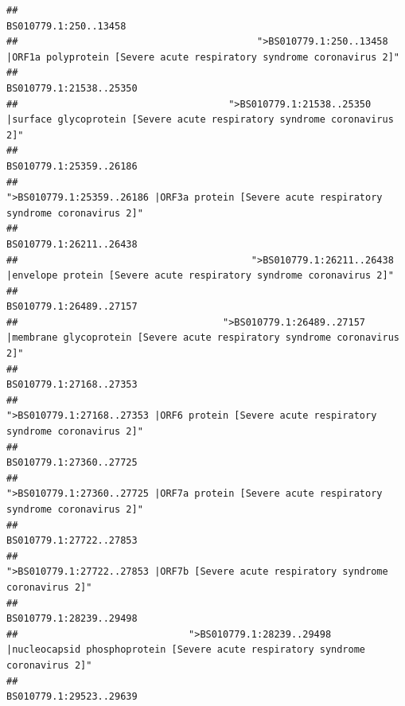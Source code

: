 \documentclass[
]{article}
\begin{document}
\begin{verbatim}
##                                                                                                                  BS010779.1:250..13458 
##                                          ">BS010779.1:250..13458 |ORF1a polyprotein [Severe acute respiratory syndrome coronavirus 2]" 
##                                                                                                                BS010779.1:21538..25350 
##                                     ">BS010779.1:21538..25350 |surface glycoprotein [Severe acute respiratory syndrome coronavirus 2]" 
##                                                                                                                BS010779.1:25359..26186 
##                                            ">BS010779.1:25359..26186 |ORF3a protein [Severe acute respiratory syndrome coronavirus 2]" 
##                                                                                                                BS010779.1:26211..26438 
##                                         ">BS010779.1:26211..26438 |envelope protein [Severe acute respiratory syndrome coronavirus 2]" 
##                                                                                                                BS010779.1:26489..27157 
##                                    ">BS010779.1:26489..27157 |membrane glycoprotein [Severe acute respiratory syndrome coronavirus 2]" 
##                                                                                                                BS010779.1:27168..27353 
##                                             ">BS010779.1:27168..27353 |ORF6 protein [Severe acute respiratory syndrome coronavirus 2]" 
##                                                                                                                BS010779.1:27360..27725 
##                                            ">BS010779.1:27360..27725 |ORF7a protein [Severe acute respiratory syndrome coronavirus 2]" 
##                                                                                                                BS010779.1:27722..27853 
##                                                    ">BS010779.1:27722..27853 |ORF7b [Severe acute respiratory syndrome coronavirus 2]" 
##                                                                                                                BS010779.1:28239..29498 
##                              ">BS010779.1:28239..29498 |nucleocapsid phosphoprotein [Severe acute respiratory syndrome coronavirus 2]" 
##                                                                                                                BS010779.1:29523..29639 

\end{verbatim}
\end{document}
